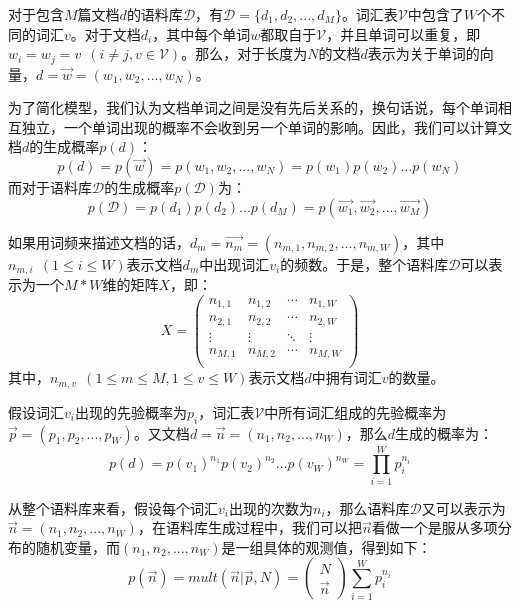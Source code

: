 对于包含$M$篇文档$d$的语料库$\mathcal{D}$，有$\mathcal{D}=\{d_1,d_2,...,d_M\}$。词汇表$\mathcal{V}$中包含了$W$个不同的词汇$v$。对于文档$d_i$，其中每个单词$w$都取自于$\mathcal{V}$，并且单词可以重复，即$w_i=w_j=v~~(i\ne j, v\in \mathcal{V})$。那么，对于长度为$N$的文档$d$表示为关于单词的向量，$d=\vec{w}=(w_1,w_2,...,w_N)$。

为了简化模型，我们认为文档单词之间是没有先后关系的，换句话说，每个单词相互独立，一个单词出现的概率不会收到另一个单词的影响。因此，我们可以计算文档$d$的生成概率$p(d)$：
\begin{equation}
  p(d)=p(\vec{w})=p(w_1,w_2,...,w_N)=p(w_1)p(w_2)...p(w_N)
\end{equation}
而对于语料库$\mathcal{D}$的生成概率$p(\mathcal{D})$为：
\begin{equation}
  p(\mathcal{D})=p(d_1)p(d_2)...p(d_M)=p(\vec{w_1},\vec{w_2},...,\vec{w_M})
\end{equation}

如果用词频来描述文档的话，$d_m=\vec{n_m}=(n_{m,1},n_{m,2},...,n_{m,W})$，其中$n_{m,i}~~(1\le i\le W)$表示文档$d_m$中出现词汇$v_i$的频数。于是，整个语料库$\mathcal{D}$可以表示为一个$M*W$维的矩阵$X$，即：
\begin{equation*}
  X=\left(
  \begin{array}{cccc}
    n_{1,1} & n_{1,2} & \cdots & n_{1,W} \\
    n_{2,1} & n_{2,2} & \cdots & n_{2,W} \\
    \vdots & \vdots & \ddots & \vdots \\ 
    n_{M,1} & n_{M,2} & \cdots & n_{M,W} \\
  \end{array}
  \right)
\end{equation*}
其中，$n_{m,v}~~(1\le m\le M,1\le v\le W)$表示文档$d$中拥有词汇$v$的数量。

假设词汇$v_i$出现的先验概率为$p_i$，词汇表$\mathcal{V}$中所有词汇组成的先验概率为$\vec{p}=(p_1,p_2,...,p_W)$。又文档$d=\vec{n}=(n_1,n_2,...,n_W)$，那么$d$生成的概率为：
\begin{equation}
  p(d)=p(v_1)^{n_1}p(v_2)^{n_2}...p(v_W)^{n_W}=\prod_{i=1}^{W}p_i^{n_i}
\end{equation}

从整个语料库来看，假设每个词汇$v_i$出现的次数为$n_i$，那么语料库$\mathcal{D}$又可以表示为$\vec{n}=(n_1,n_2,...,n_W)$，在语料库生成过程中，我们可以把$\vec{n}$看做一个是服从多项分布的随机变量，而$(n_1,n_2,...,n_W)$是一组具体的观测值，得到如下：
\begin{equation}
  p(\vec{n})=mult(\vec{n}|\vec{p},N)=
  \begin{pmatrix}
    N \\
    \vec{n}
  \end{pmatrix}
  \sum_{i=1}^Wp_i^{n_i}
\end{equation}

